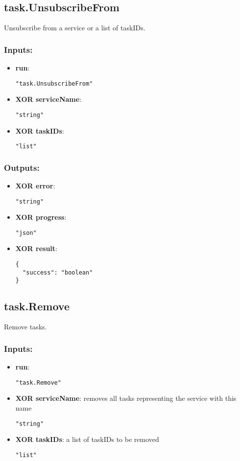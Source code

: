 \subsection{task.UnsubscribeFrom}
Unsubscribe from a service or a list of taskIDs.
\subsubsection*{Inputs:}
\begin{itemize}
    \item \textbf{run}: 
\begin{lstlisting}
"task.UnsubscribeFrom"
\end{lstlisting}
    \item \textbf{XOR serviceName}: 
\begin{lstlisting}
"string"
\end{lstlisting}
    \item \textbf{XOR taskIDs}: 
\begin{lstlisting}
"list"
\end{lstlisting}
  \end{itemize}

\subsubsection*{Outputs:}
\begin{itemize}
    \item \textbf{XOR error}: 
\begin{lstlisting}
"string"
\end{lstlisting}
    \item \textbf{XOR progress}: 
\begin{lstlisting}
"json"
\end{lstlisting}
    \item \textbf{XOR result}: 
\begin{lstlisting}
{
  "success": "boolean"
}
\end{lstlisting}
  \end{itemize}

\subsection{task.Remove}
Remove tasks.
\subsubsection*{Inputs:}
\begin{itemize}
    \item \textbf{run}: 
\begin{lstlisting}
"task.Remove"
\end{lstlisting}
    \item \textbf{XOR serviceName}: removes all tasks representing the service with this name
\begin{lstlisting}
"string"
\end{lstlisting}
    \item \textbf{XOR taskIDs}: a list of taskIDs to be removed
\begin{lstlisting}
"list"
\end{lstlisting}
  \end{itemize}


